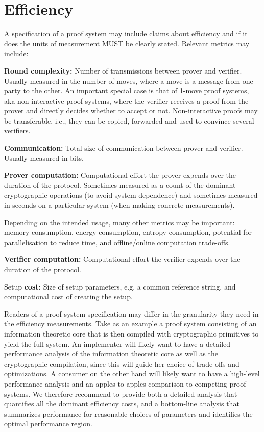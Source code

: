 \section{Efficiency}
\label{security:Efficiency}
 
A specification of a proof system may include claims about efficiency and if it does the units of measurement MUST be clearly stated. Relevant metrics may include:

\begin{bulletize}
    \item \textbf{Round complexity:} Number of transmissions between prover and verifier. Usually measured in the number of moves, where a move is a message from one party to the other.
An important special case is that of 1-move proof systems, aka non-interactive proof systems, where the verifier receives a proof from the prover and directly decides whether to accept or not. Non-interactive proofs may be transferable, i.e., they can be copied, forwarded and used to convince several verifiers.
    \item \textbf{Communication:} Total size of communication between prover and verifier. Usually measured in bits.
    \item \textbf{Prover computation:} Computational effort the prover expends over the duration of the protocol. Sometimes measured as a count of the dominant cryptographic operations (to avoid system dependence) and sometimes measured in seconds on a particular system (when making concrete measurements).
    \item Depending on the intended usage, many other metrics may be important: memory consumption, energy consumption, entropy consumption, potential for parallelisation to reduce time, and offline/online computation trade-offs.
    \item \textbf{Verifier computation:} Computational effort the verifier expends over the duration of the protocol.
    \item Setup \textbf{cost:} Size of setup parameters, e.g. a common reference string, and computational cost of creating the setup.
\end{bulletize} 

Readers of a proof system specification may differ in the granularity they need in the efficiency measurements. Take as an example a proof system consisting of an information theoretic core that is then compiled with cryptographic primitives to yield the full system. An implementer will likely want to have a detailed performance analysis of the information theoretic core as well as the cryptographic compilation, since this will guide her choice of trade-offs and optimizations. A consumer on the other hand will likely want to have a high-level performance analysis and an apples-to-apples comparison to competing proof systems. We therefore recommend to provide both a detailed analysis that quantifies all the dominant efficiency costs, and a bottom-line analysis that summarizes performance for reasonable choices of parameters and identifies the optimal performance region.
\loosen



